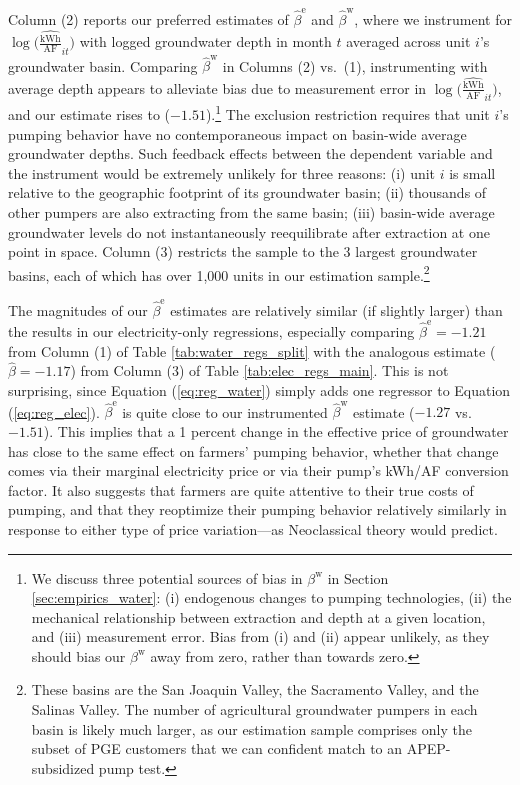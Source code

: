 Column (2) reports our preferred estimates of $\hat\beta^{\text{e}}$ and $\hat\beta^{\text{w}}$, where we instrument for $\log\big(\widehat{\tfrac{{\text{kWh}}}{\text{AF}}}_{it}\big)$ with logged groundwater depth in month $t$ averaged across unit $i$'s groundwater basin. Comparing $\hat\beta^{\text{w}}$ in Columns (2) vs.\ (1), instrumenting with average depth appears to alleviate bias due to measurement error in $\log\big(\widehat{\tfrac{{\text{kWh}}}{\text{AF}}}_{it}\big)$, and our estimate rises to ($-1.51$).\footnote{
We discuss three potential sources of bias in $\beta^{\text{w}}$ in Section \ref{sec:empirics_water}: (i) endogenous changes to pumping technologies, (ii) the mechanical relationship between extraction and depth at a given location, and (iii) measurement error. Bias from (i) and (ii) appear unlikely, as they should bias our $\beta^{\text{w}}$ away from zero, rather than towards zero.
}
The exclusion restriction requires that unit $i$'s pumping behavior have no contemporaneous impact on basin-wide average groundwater depths. Such feedback effects between the dependent variable and the instrument would be extremely unlikely for three reasons: (i) unit $i$ is small relative to the geographic footprint of its groundwater basin; (ii) thousands of other pumpers are also extracting from the same basin; (iii) basin-wide average groundwater levels do not instantaneously reequilibrate after extraction at one point in space. Column (3) restricts the sample to the 3 largest groundwater basins, each of which has over 1,000 units in our estimation sample.\footnote{These basins are the San Joaquin Valley, the Sacramento Valley, and the Salinas Valley. The number of agricultural groundwater pumpers in each basin is likely much larger, as our estimation sample comprises only the subset of PGE customers that we can confident match to an APEP-subsidized pump test.
}

The magnitudes of our $\hat\beta^{\text{e}}$ estimates are relatively similar (if slightly larger) than the results in our electricity-only regressions, especially comparing $\hat\beta^{\text{e}} = -1.21$ from Column (1) of Table \ref{tab:water_regs_split} with the analogous estimate ($\hat\beta = -1.17$) from Column (3) of Table \ref{tab:elec_regs_main}. This is not surprising, since Equation (\ref{eq:reg_water}) simply adds one regressor to Equation (\ref{eq:reg_elec}). $\hat\beta^{\text{e}}$ is quite close to our instrumented $\hat\beta^{\text{w}}$ estimate ($-1.27$ vs.\ $-1.51$). This implies that a 1 percent change in the effective price of groundwater has close to the same effect on farmers' pumping behavior, whether that change comes via their marginal electricity price or via their pump's kWh/AF conversion factor. It also suggests that farmers are quite attentive to their true costs of pumping, and that they reoptimize their pumping behavior relatively similarly in response to either type of price variation---as Neoclassical theory would predict.


